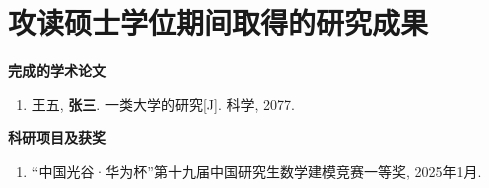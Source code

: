 \pagestyle{fancy}
\fancyhead{} %

\fancyhead[CO]{\leftmark} %
\chapter{攻读硕士学位期间取得的研究成果}

\renewcommand{\labelenumi}{[\theenumi]}

{\noindent\textbf{完成的学术论文}}
\begin{enumerate}\setlength{\itemsep}{0pt}
\item 王五, \textbf{张三}. 一类大学的研究[J]. 科学, 2077.
\end{enumerate}

{\noindent\textbf{科研项目及获奖}}
\begin{enumerate}\setlength{\itemsep}{0pt}
\item “中国光谷·华为杯”第十九届中国研究生数学建模竞赛一等奖, 2025年1月.
\end{enumerate}

